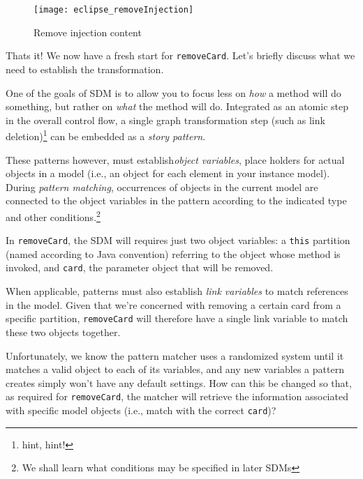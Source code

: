 \newpage

\begin{figure}[htbp]
	\centering
    \texttt{[image: eclipse\_removeInjection]}
	\caption{Remove injection content}
	\label{fig:delete_injection}
\end{figure}

\vspace{1cm}

Thats it! We now have a fresh start for \texttt{removeCard}. Let's briefly discuss what we need to establish the transformation.

One of the goals of SDM is to allow you to focus less on \emph{how} a method will do something, but rather on \emph{what} the method will do.
Integrated as an atomic step in the overall control flow, a single graph transformation step (such as link deletion)\footnote{hint, hint!} can be embedded as a
\emph{story pattern}.

These patterns however, must establish\emph{object variables}, place holders for actual objects in a model (i.e., an object for each
element in your instance model). During \emph{pattern matching}, occurrences of objects in the current model are connected to the object variables in the
pattern according to the indicated type and other conditions.\footnote{We shall learn what conditions may be specified in later SDMs}

\clearpage

In \texttt{removeCard}, the SDM will requires just two object variables: a \texttt{this} partition (named according to Java convention) referring to the
object whose method is invoked, and \texttt{card}, the parameter object that will be removed.

When applicable, patterns must also establish \emph{link variables} to match references in the model. Given that
we're concerned with removing a certain card from a specific partition, \texttt{removeCard} will therefore have a single link variable to match these two
objects together.

Unfortunately, we know the pattern matcher uses a randomized system until it matches a valid object to each of its variables, and any new variables a pattern
creates simply won't have any default settings. How can this be changed so that, as required for \texttt{removeCard}, the matcher will retrieve the information
associated with specific model objects (i.e., match with the correct \texttt{card})?

